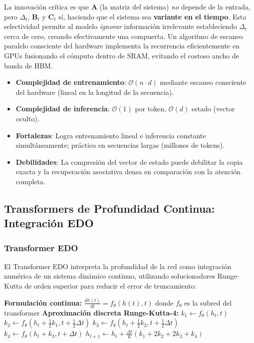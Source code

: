 La innovación crítica es que $\mathbf{A}$ (la matriz del sistema) \textit{no} depende de la entrada, pero $\Delta_t$, $\mathbf{B}_t$ y $\mathbf{C}_t$ sí, haciendo que el sistema sea \textbf{variante en el tiempo}. Esta selectividad permite al modelo \textit{ignorar} información irrelevante estableciendo $\Delta_t$ cerca de cero, creando efectivamente una compuerta. Un algoritmo de escaneo paralelo consciente del hardware implementa la recurrencia eficientemente en GPUs fusionando el cómputo dentro de SRAM, evitando el costoso ancho de banda de HBM.

\begin{itemize}[leftmargin=*]
    \item \textbf{Complejidad de entrenamiento}: $\mathcal{O}(n \cdot d)$ mediante escaneo consciente del hardware (lineal en la longitud de la secuencia).
    \item \textbf{Complejidad de inferencia}: $\mathcal{O}(1)$ por token, $\mathcal{O}(d)$ estado (vector oculto).
    \item \textbf{Fortalezas}: Logra entrenamiento lineal e inferencia constante simultáneamente; práctico en secuencias largas (millones de tokens).
    \item \textbf{Debilidades}: La compresión del vector de estado puede debilitar la copia exacta y la recuperación asociativa densa en comparación con la atención completa.
\end{itemize}

\subsection{Transformers de Profundidad Continua: Integración EDO}

\subsubsection{Transformer EDO}
El Transformer EDO \citep{zhang_continuous_2021} interpreta la profundidad de la red como integración numérica de un sistema dinámico continuo, utilizando solucionadores Runge-Kutta de orden superior para reducir el error de truncamiento:

\begin{algorithmic}[1]
\State \textbf{Formulación continua:} $\frac{dh(t)}{dt} = f_\theta(h(t), t)$ donde $f_\theta$ es la subred del transformer
\State \textbf{Aproximación discreta Runge-Kutta-4:}
\State $k_1 \gets f_\theta(h_t, t)$
\State $k_2 \gets f_\theta(h_t + \tfrac{1}{2}k_1, t + \tfrac{1}{2}\Delta t)$
\State $k_3 \gets f_\theta(h_t + \tfrac{1}{2}k_2, t + \tfrac{1}{2}\Delta t)$
\State $k_4 \gets f_\theta(h_t + k_3, t + \Delta t)$
\State $h_{t+1} \gets h_t + \frac{\Delta t}{6}(k_1 + 2k_2 + 2k_3 + k_4)$ 
\end{algorithmic}

